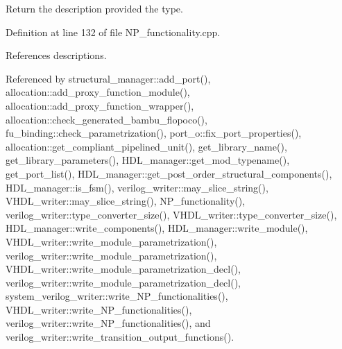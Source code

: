 Return the description provided the type. 



Definition at line 132 of file N\+P\+\_\+functionality.\+cpp.



References descriptions.



Referenced by structural\+\_\+manager\+::add\+\_\+port(), allocation\+::add\+\_\+proxy\+\_\+function\+\_\+module(), allocation\+::add\+\_\+proxy\+\_\+function\+\_\+wrapper(), allocation\+::check\+\_\+generated\+\_\+bambu\+\_\+flopoco(), fu\+\_\+binding\+::check\+\_\+parametrization(), port\+\_\+o\+::fix\+\_\+port\+\_\+properties(), allocation\+::get\+\_\+compliant\+\_\+pipelined\+\_\+unit(), get\+\_\+library\+\_\+name(), get\+\_\+library\+\_\+parameters(), H\+D\+L\+\_\+manager\+::get\+\_\+mod\+\_\+typename(), get\+\_\+port\+\_\+list(), H\+D\+L\+\_\+manager\+::get\+\_\+post\+\_\+order\+\_\+structural\+\_\+components(), H\+D\+L\+\_\+manager\+::is\+\_\+fsm(), verilog\+\_\+writer\+::may\+\_\+slice\+\_\+string(), V\+H\+D\+L\+\_\+writer\+::may\+\_\+slice\+\_\+string(), N\+P\+\_\+functionality(), verilog\+\_\+writer\+::type\+\_\+converter\+\_\+size(), V\+H\+D\+L\+\_\+writer\+::type\+\_\+converter\+\_\+size(), H\+D\+L\+\_\+manager\+::write\+\_\+components(), H\+D\+L\+\_\+manager\+::write\+\_\+module(), V\+H\+D\+L\+\_\+writer\+::write\+\_\+module\+\_\+parametrization(), verilog\+\_\+writer\+::write\+\_\+module\+\_\+parametrization(), V\+H\+D\+L\+\_\+writer\+::write\+\_\+module\+\_\+parametrization\+\_\+decl(), verilog\+\_\+writer\+::write\+\_\+module\+\_\+parametrization\+\_\+decl(), system\+\_\+verilog\+\_\+writer\+::write\+\_\+\+N\+P\+\_\+functionalities(), V\+H\+D\+L\+\_\+writer\+::write\+\_\+\+N\+P\+\_\+functionalities(), verilog\+\_\+writer\+::write\+\_\+\+N\+P\+\_\+functionalities(), and verilog\+\_\+writer\+::write\+\_\+transition\+\_\+output\+\_\+functions().

